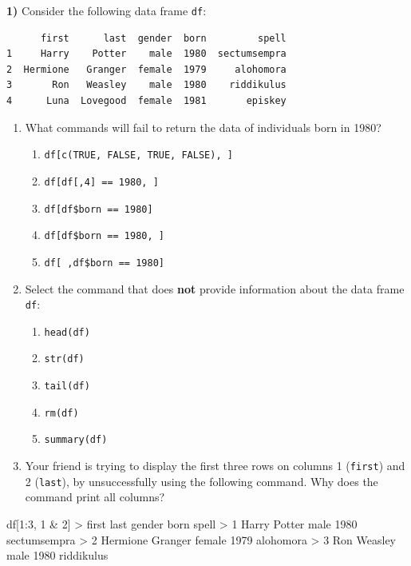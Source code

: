 \documentclass[
]{book}
\newenvironment{Shaded}{\begin{snugshade}}{\end{snugshade}}
\newcommand{\DecValTok}[1]{\textcolor[rgb]{0.00,0.00,0.81}{#1}}
\newcommand{\NormalTok}[1]{#1}
\newcommand{\SpecialCharTok}[1]{\textcolor[rgb]{0.00,0.00,0.00}{#1}}
\begin{document}
\textbf{1)} Consider the following data frame \texttt{df}:

\begin{verbatim}
      first      last  gender  born         spell
1     Harry    Potter    male  1980  sectumsempra
2  Hermione   Granger  female  1979     alohomora
3       Ron   Weasley    male  1980    riddikulus
4      Luna  Lovegood  female  1981       episkey
\end{verbatim}

\begin{enumerate}
\def\labelenumi{\alph{enumi})}
\item
  What commands will fail to return the data of individuals born in 1980?

  \begin{enumerate}
  \def\labelenumii{\roman{enumii})}
  \item
    \texttt{df{[}c(TRUE,\ FALSE,\ TRUE,\ FALSE),\ {]}}
  \item
    \texttt{df{[}df{[},4{]}\ ==\ 1980,\ {]}}
  \item
    \texttt{df{[}df\$born\ ==\ 1980{]}}
  \item
    \texttt{df{[}df\$born\ ==\ 1980,\ {]}}
  \item
    \texttt{df{[}\ ,df\$born\ ==\ 1980{]}}
  \end{enumerate}
\item
  Select the command that does \textbf{not} provide information about the data
  frame \texttt{df}:

  \begin{enumerate}
  \def\labelenumii{\roman{enumii})}
  \item
    \texttt{head(df)}
  \item
    \texttt{str(df)}
  \item
    \texttt{tail(df)}
  \item
    \texttt{rm(df)}
  \item
    \texttt{summary(df)}
  \end{enumerate}
\item
  Your friend is trying to display the first three rows on columns 1 (\texttt{first})
  and 2 (\texttt{last}), by unsuccessfully using the following command.
  Why does the command print all columns?
\end{enumerate}

\begin{Shaded}
\begin{Highlighting}[]
\NormalTok{df[}\DecValTok{1}\SpecialCharTok{:}\DecValTok{3}\NormalTok{, }\DecValTok{1} \SpecialCharTok{\&} \DecValTok{2}\NormalTok{]}
\SpecialCharTok{\textgreater{}}\NormalTok{      first    last gender born        spell}
\SpecialCharTok{\textgreater{}} \DecValTok{1}\NormalTok{    Harry  Potter   male }\DecValTok{1980}\NormalTok{ sectumsempra}
\SpecialCharTok{\textgreater{}} \DecValTok{2}\NormalTok{ Hermione Granger female }\DecValTok{1979}\NormalTok{    alohomora}
\SpecialCharTok{\textgreater{}} \DecValTok{3}\NormalTok{      Ron Weasley   male }\DecValTok{1980}\NormalTok{   riddikulus}
\end{Highlighting}
\end{Shaded}
\end{document}
